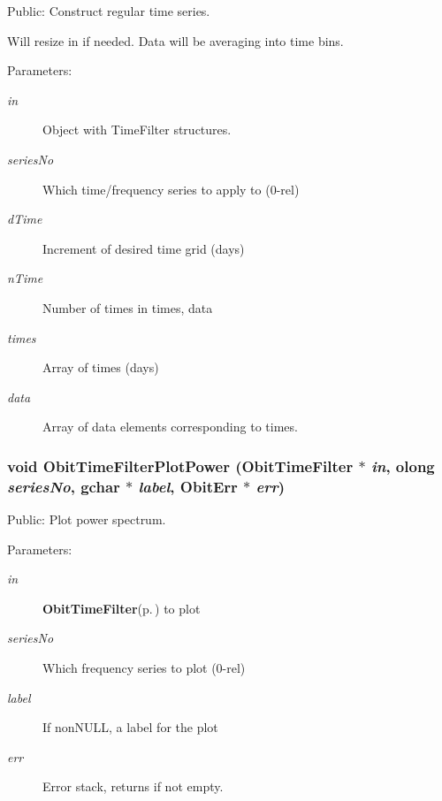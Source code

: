 Public: Construct regular time series. 

Will resize in if needed. Data will be averaging into time bins. \begin{Desc}
\item[Parameters:]
\begin{description}
\item[{\em in}]Object with Time\-Filter structures. \item[{\em series\-No}]Which time/frequency series to apply to (0-rel) \item[{\em d\-Time}]Increment of desired time grid (days) \item[{\em n\-Time}]Number of times in times, data \item[{\em times}]Array of times (days) \item[{\em data}]Array of data elements corresponding to times. \end{description}
\end{Desc}
\subsubsection{\setlength{\rightskip}{0pt plus 5cm}void Obit\-Time\-Filter\-Plot\-Power ({\bf Obit\-Time\-Filter} $\ast$ {\em in}, {\bf olong} {\em series\-No}, gchar $\ast$ {\em label}, {\bf Obit\-Err} $\ast$ {\em err})}\label{ObitTimeFilter_8h_a26}


Public: Plot power spectrum. 

\begin{Desc}
\item[Parameters:]
\begin{description}
\item[{\em in}]{\bf Obit\-Time\-Filter}{\rm (p.\,\pageref{structObitTimeFilter})} to plot \item[{\em series\-No}]Which frequency series to plot (0-rel) \item[{\em label}]If non\-NULL, a label for the plot \item[{\em err}]Error stack, returns if not empty. \end{description}
\end{Desc}
